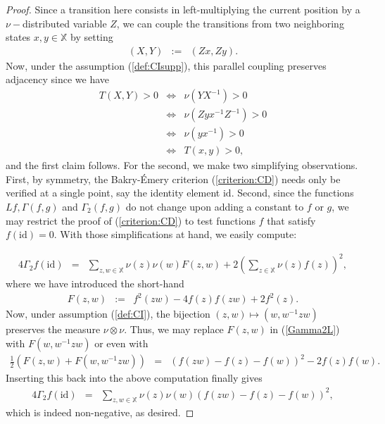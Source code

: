 \documentclass[12pt,final]{article}
\numberwithin{equation}{section}
\newcommand{\id}{\mathrm {id}}
\newcommand{\dX}{\mathbb{X}}
\begin{document}
\begin{proof}
Since a transition here consists in left-multiplying the current position by a $\nu-$distributed variable $Z$, we can couple the transitions from two neighboring states $x,y\in\dX$ by setting
\begin{eqnarray*}
(X,Y) & := & (Zx,Zy).
\end{eqnarray*}
Now, under the assumption (\ref{def:CIsupp}), this parallel coupling preserves adjacency since we have
\begin{eqnarray*}
T(X,Y)>0 & \Longleftrightarrow & \nu(YX^{-1})>0 \\
& \Longleftrightarrow & \nu\left(Zyx^{-1}Z^{-1}\right)>0\\
& \Longleftrightarrow & \nu\left(yx^{-1}\right)>0\\
& \Longleftrightarrow & T(x,y)>0,
\end{eqnarray*}
 and the first claim follows.  For the second, we make two simplifying observations. First, by symmetry, the Bakry-\'Emery criterion (\ref{criterion:CD}) needs only be verified at a single point, say the identity element $\id$. Second, since the functions $Lf,\Gamma(f,g)$ and $\Gamma_2(f,g)$ do not change upon adding a constant to $f$ or $g$, we may restrict the proof of  (\ref{criterion:CD}) to test functions $f$ that satisfy $f(\id)=0$. With those simplifications at hand, we easily compute:

\begin{eqnarray}
\label{Gamma2L}
4\Gamma_2 f(\id) & = & \sum_{z,w\in\dX}\nu(z)\nu(w)F(z,w)+2\left(\sum_{z\in\dX}\nu(z)f(z)\right)^2,
\end{eqnarray}
where we have introduced the short-hand
\begin{eqnarray*}
F(z,w) & := & f^2(zw)-4f(z)f(zw)+2f^2(z).
\end{eqnarray*}
Now, under assumption (\ref{def:CI}), the bijection $(z,w)\mapsto(w,w^{-1}zw)$ preserves the measure $\nu\otimes\nu$. Thus, we may  replace $F(z,w)$ in (\ref{Gamma2L}) with $F(w,w^{-1}zw)$ or even with 
\begin{eqnarray*}
\frac 12\left(F(z,w)+F(w,w^{-1}zw)\right)  %
& = & \left(f(zw)-f(z)-f(w)\right)^2-2f(z)f(w).
\end{eqnarray*}
Inserting this back into the above computation finally gives
\begin{eqnarray}
\label{CIconclude}
4\Gamma_2 f(\id) & = & \sum_{z,w\in\dX}\nu(z)\nu(w) \left(f(zw)-f(z)-f(w)\right)^2,
\end{eqnarray}which is indeed non-negative, as desired. 
\end{proof}
\end{document}
